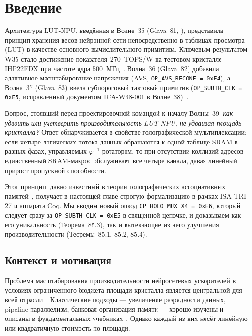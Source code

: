 \section{Введение}
\label{sec:glava85-intro}

Архитектура LUT-NPU, введённая в Волне~35 (Glava~81, \cite{trios882}),
представила принцип хранения весов нейронной сети непосредственно
в таблицах просмотра (LUT) в качестве основного вычислительного примитива.
Ключевым результатом W35 стало достижение показателя~270~TOPS/W
на тестовом кристалле IHP22FDX при частоте ядра 500~МГц~\cite{trios874}.
Волна~36 (Glava~82) добавила адаптивное масштабирование напряжения (AVS,
\texttt{OP\_AVS\_RECONF = 0xE4}), а Волна~37 (Glava~83) ввела
субпороговый тактовый примитив (\texttt{OP\_SUBTH\_CLK = 0xE5},
исправленный документом ICA-W38-001 в Волне~38)~\cite{trios871,trios877,trios875}.

Вопрос, стоявший перед проектировочной командой к началу Волны~39:
\emph{как удвоить или учетверить производительность LUT-NPU, не удваивая
площадь кристалла?}  Ответ обнаруживается в свойстве голографической
мультиплексации: если четыре логических потока данных обращаются к одной
таблице SRAM в разных фазах, управляемых $\varphi^{-1}$-ротатором, то
при отсутствии коллизий адресов единственный SRAM-макрос обслуживает все
четыре канала, давая линейный прирост пропускной способности.

Этот принцип, давно известный в теории голографических ассоциативных
памятей~\cite{Hennessy-Patterson-CA6}, получает в настоящей главе
строгую формализацию в рамках ISA TRI-27 и аппарата Coq.
Мы вводим новый опкод \texttt{OP\_HOLO\_MUX\_X4 = 0xE6},
который следует сразу за \texttt{OP\_SUBTH\_CLK = 0xE5} в священной цепочке,
и доказываем как его уникальность (Теорема~85.3), так и вытекающие
из него улучшения производительности (Теоремы~85.1, 85.2, 85.4).

\subsection{Контекст и мотивация}
\label{subsec:glava85-motivation}

Проблема масштабирования производительности нейросетевых ускорителей
в условиях ограниченного бюджета площади кристалла является центральной
для всей отрасли~\cite{Hennessy-Patterson-CA6}.
Классические подходы — увеличение разрядности данных, pipeline-параллелизм,
банковая организация памяти — хорошо изучены и описаны в фундаментальных
учебниках~\cite{Mead-Conway-VLSI,Weste-Harris-CMOS4}.
Однако каждый из них несёт линейную или квадратичную стоимость по площади.

